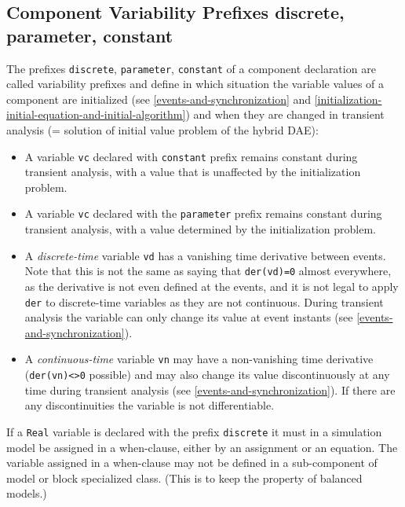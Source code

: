 \subsection{Component Variability Prefixes discrete, parameter, constant}\label{component-variability-prefixes-discrete-parameter-constant}

The prefixes \lstinline!discrete!, \lstinline!parameter!, \lstinline!constant! of a component declaration
are called variability prefixes and define in which situation the
variable values of a component are initialized (see \cref{events-and-synchronization} and
\cref{initialization-initial-equation-and-initial-algorithm}) and when they are changed in transient analysis (= solution
of initial value problem of the hybrid DAE):
\begin{itemize}
\item
  A variable \lstinline!vc! declared with \lstinline!constant! prefix remains constant during transient analysis,
  with a value that is unaffected by the initialization problem.
\item
  A variable \lstinline!vc! declared with the \lstinline!parameter! prefix remains constant during transient analysis,
  with a value determined by the initialization problem.
\item
  A \emph{discrete-time} variable \lstinline!vd! has a vanishing time derivative between events.
  Note that this is not the same as saying that \lstinline!der(vd)=0! almost everywhere,
  as the derivative is not even defined at the events, and it is not legal
  to apply \lstinline!der! to discrete-time variables as they are not continuous. During transient analysis the variable
  can only change its value at event
  instants (see \cref{events-and-synchronization}).
\item
  A \emph{continuous-time} variable \lstinline!vn! may have a non-vanishing time
  derivative (\lstinline!der(vn)<>0! possible) and may also
  change its value discontinuously at any time during transient analysis
  (see \cref{events-and-synchronization}). If there are any discontinuities the variable is
  not differentiable.
\end{itemize}

If a \lstinline!Real! variable is declared with the prefix \lstinline!discrete! it must in a
simulation model be assigned in a when-clause, either by an assignment
or an equation. The variable assigned in a when-clause may not be
defined in a sub-component of model or block specialized class.
(This is to keep the property of balanced models.)

